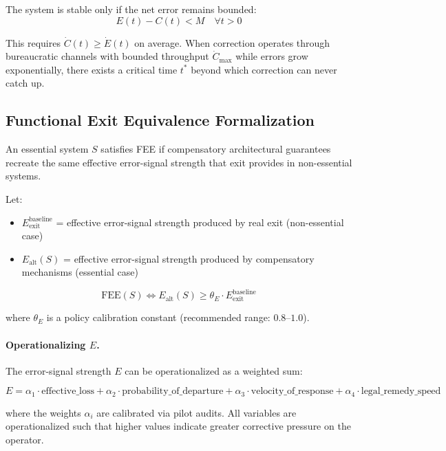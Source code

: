 \documentclass{article}
\begin{document}
The system is stable only if the net error remains bounded:
\begin{equation}
E(t) - C(t) < M \quad \forall t > 0
\end{equation}

This requires $\dot{C}(t) \geq \dot{E}(t)$ on average. When correction operates through bureaucratic channels with bounded throughput $\dot{C}_{\max}$ while errors grow exponentially, there exists a critical time $t^*$ beyond which correction can never catch up.

\subsection{Functional Exit Equivalence Formalization}

An essential system $S$ satisfies FEE if compensatory architectural guarantees recreate the same effective error-signal strength that exit provides in non-essential systems.

Let:
\begin{itemize}[noitemsep]
    \item $E_{\text{exit}}^{\text{baseline}}$ = effective error-signal strength produced by real exit (non-essential case)
    \item $E_{\text{alt}}(S)$ = effective error-signal strength produced by compensatory mechanisms (essential case)
\end{itemize}

\begin{equation}
\text{FEE}(S) \iff E_{\text{alt}}(S) \geq \theta_E \cdot E_{\text{exit}}^{\text{baseline}}
\label{eq:fee}
\end{equation}

where $\theta_E$ is a policy calibration constant (recommended range: $0.8$--$1.0$).

\paragraph{Operationalizing $E$.} The error-signal strength $E$ can be operationalized as a weighted sum:

\begin{equation}
E = \alpha_1 \cdot \text{effective\_loss} + \alpha_2 \cdot \text{probability\_of\_departure} + \alpha_3 \cdot \text{velocity\_of\_response} + \alpha_4 \cdot \text{legal\_remedy\_speed}
\label{eq:error-signal}
\end{equation}

where the weights $\alpha_i$ are calibrated via pilot audits. All variables are operationalized such that higher values indicate greater corrective pressure on the operator.
\end{document}
